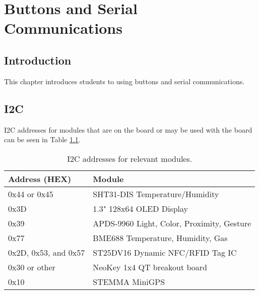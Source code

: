 \chapter{Buttons and Serial Communications}

\section{Introduction}
This chapter introduces students to using buttons and serial communications.

\section{I2C}
I2C addresses for modules that are on the board or may be used with the board can be seen in Table \ref{table:i2caddresses}.

\begin{table}[!ht]
	\centering
	\begin{tabular}{l l}
		\hline
		Address (HEX) & Module \\ 
		\hline
		0x44 or 0x45 & SHT31-DIS Temperature/Humidity \\
		0x3D & 1.3" 128x64 OLED Display \\
		0x39 & APDS-9960 Light, Color, Proximity, Gesture \\
		0x77 & BME688 Temperature, Humidity, Gas \\
		0x2D, 0x53, and 0x57 & ST25DV16 Dynamic NFC/RFID Tag IC \\
		0x30 or other  & NeoKey 1x4 QT breakout board \\
		0x10 & STEMMA MiniGPS \\
		\hline
	\end{tabular}
	\caption{I2C addresses for relevant modules.}
	\label{table:i2caddresses}
\end{table}